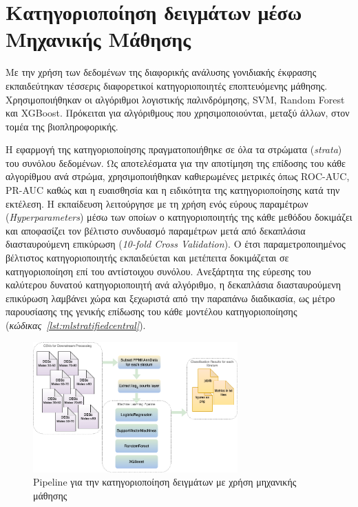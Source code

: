 \documentclass[12pt]{report}
\begin{document}
    \section{Κατηγοριοποίηση δειγμάτων μέσω Μηχανικής Μάθησης}
        \par
            Με την χρήση των δεδομένων της διαφορικής ανάλυσης γονιδιακής έκφρασης εκπαιδεύτηκαν τέσσερις διαφορετικοί κατηγοριοποιητές εποπτευόμενης μάθησης. Χρησιμοποιήθηκαν οι αλγόριθμοι λογιστικής παλινδρόμησης, SVM, Random Forest και XGBoost. Πρόκειται για αλγόριθμους που χρησιμοποιούνται, μεταξύ άλλων, στον τομέα της βιοπληροφορικής.
        \par
            Η εφαρμογή της κατηγοριοποίησης πραγματοποιήθηκε σε όλα τα στρώματα (\emph{strata}) του συνόλου δεδομένων. Ως αποτελέσματα για την αποτίμηση της επίδοσης του κάθε αλγορίθμου ανά στρώμα, χρησιμοποιήθηκαν καθιερωμένες μετρικές όπως ROC-AUC, PR-AUC καθώς και η ευαισθησία και η ειδικότητα της κατηγοριοποίησης κατά την εκτέλεση. Η εκπαίδευση λειτούργησε με τη χρήση ενός εύρους παραμέτρων (\emph{Hyperparameters}) μέσω των οποίων ο κατηγοριοποιητής της κάθε μεθόδου δοκιμάζει και αποφασίζει τον βέλτιστο συνδυασμό παραμέτρων μετά από δεκαπλάσια διασταυρούμενη επικύρωση (\emph{10-fold Cross Validation}). Ο έτσι παραμετροποιημένος βέλτιστος κατηγοριοποιητής εκπαιδεύεται και μετέπειτα δοκιμάζεται σε κατηγοριοποίηση επί του αντίστοιχου συνόλου. Ανεξάρτητα της εύρεσης του καλύτερου δυνατού κατηγοριοποιητή ανά αλγόριθμο, η δεκαπλάσια διασταυρούμενη επικύρωση λαμβάνει χώρα και ξεχωριστά από την παραπάνω διαδικασία, ως μέτρο παρουσίασης της γενικής επίδωσης του κάθε μοντέλου κατηγοριοποίησης (\emph{κώδικας~\ref{lst:mlstratifiedcentral}}).
            \begin{figure}[h]
                \centering
                \includegraphics[width=0.7\textwidth]{ML/msci-big-pic-ML-blocks.png}
                \caption{Pipeline για την κατηγοριοποίηση δειγμάτων με χρήση μηχανικής μάθησης}
                \label{fig:msci-big-pic-ML-blocks}
            \end{figure}
\end{document}
